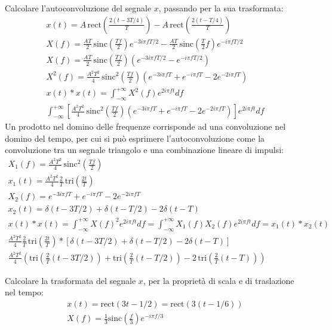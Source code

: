 \documentclass{article}
\numberwithin{equation}{subsection}
\begin{document}
Calcolare l'autoconvoluzione del segnale $x$, passando per la sua trasformata: 
\begin{gather*}
    x(t)=A\,\mbox{rect}\displaystyle\left(\frac{2(t-3T/4)}{T}\right)-A\,\mbox{rect}\displaystyle\left(\frac{2(t-T/4)}{T}\right)\\
    X(f)=\displaystyle\frac{AT}{2}\,\mbox{sinc}\left(\frac{Tf}{2}\right)e^{-3i\pi fT/2}-\displaystyle\frac{AT}{2}\,\mbox{sinc}\left(\frac{T}{2}f\right)e^{-i\pi fT/2}\\
    X(f)=\displaystyle\frac{AT}{2}\,\mbox{sinc}\left(\frac{Tf}{2}\right)\left(e^{-3i\pi fT/2}-e^{-i\pi fT/2}\right)\\
    X^2(f)=\displaystyle\frac{A^2T^2}{4}\,\mbox{sinc}^2\left(\frac{Tf}{2}\right)\left(e^{-3i\pi fT}+e^{-i\pi fT}-2e^{-2i\pi fT}\right)\\
    x(t)*x(t)=\displaystyle\int_{-\infty}^{+\infty}X^2(f)e^{2i\pi ft}df\\
    \displaystyle\int_{-\infty}^{+\infty}\left[\frac{A^2T^2}{4}\,\mbox{sinc}^2\left(\frac{Tf}{2}\right)\left(e^{-3i\pi fT}+e^{-i\pi fT}-2e^{-2i\pi fT}\right)\right]e^{2i\pi ft}df
\end{gather*}
Un prodotto nel domino delle frequenze corrisponde ad una convoluzione nel domino del tempo, per cui si può esprimere l'autoconvoluzione come la convoluzione tra un segnale 
triangolo e una combinazione lineare di impulsi:
\begin{gather*}
    X_1(f)=\displaystyle\frac{A^2T^2}{4}\,\mbox{sinc}^2\left(\frac{Tf}{2}\right)\\
    x_1(t)=\displaystyle\frac{A^2T^2}{4}\frac{2}{T}\,\mbox{tri}\left(\frac{2t}{T}\right)\\
    X_2(f)=e^{-3i\pi fT}+e^{-i\pi fT}-2e^{-2i\pi fT}\\
    x_2(t)=\delta(t-3T/2)+\delta(t-T/2)-2\delta(t-T)\\
    x(t)*x(t)=\displaystyle\int_{-\infty}^{+\infty}X(f)^2e^{2i\pi ft}df=\int_{-\infty}^{+\infty}X_1(f)X_2(f)e^{2i\pi ft}df=x_1(t)*x_2(t)\\
    \displaystyle\frac{A^2T^2}{4}\frac{2}{T}\,\mbox{tri}\left(\frac{2t}{T}\right)*\left[\delta(t-3T/2)+\delta(t-T/2)-2\delta(t-T)\right]\\
    \displaystyle\frac{A^2T^2}{4}\left(\mbox{tri}\left(\frac{2}{T}(t-3T/2)\right)+\mbox{tri}\left(\frac{2}{T}(t-T/2)\right)-2\,\mbox{tri}\left(\frac{2}{T}(t-T)\right)\right)
\end{gather*}

Calcolare la trasformata del segnale $x$, per la proprietà di scala e di traslazione nel tempo:
\begin{gather*}
    x(t)=\mbox{rect}(3t-1/2)=\mbox{rect}(3(t-1/6))\\
    X(f)=\displaystyle\frac{1}{3}\mbox{sinc}\left(\frac{f}{3}\right)e^{-i\pi f/3}
\end{gather*}
\end{document}
